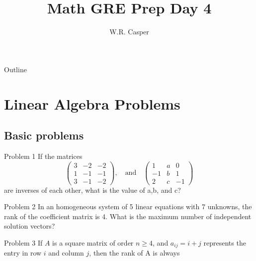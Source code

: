 \documentclass{beamer}
\title{Math GRE Prep Day 4}
\subtitle
{} %
\author[W.R. Casper] %
{W.R. Casper}
\institute[California State University Fullerton] %
{
  Department of Mathematics\\
  California State University Fullerton}
\begin{document}
\begin{frame}
  \titlepage
\end{frame}

\begin{frame}{Outline}
  \tableofcontents
\end{frame}



\section{Linear Algebra Problems}

\subsection{Basic problems}

\begin{frame}{Problem 1}
If the matrices
$$
\left(\begin{array}{ccc}
3 & -2 & -2\\
1 & -1 & -1\\
3 & -1 & -2
\end{array}\right)
,\quad\text{and}\quad
\left(\begin{array}{ccc}
 1 & a & 0\\
-1 & b & 1\\
 2 & c &-1
\end{array}\right)
$$
are inverses of each other, what is the value of a,b, and c?
\end{frame}

\begin{frame}{Problem 2}
In an homogeneous system of 5 linear equations with 7 unknowns, the rank of the coefficient matrix is 4. What is the maximum number of independent solution vectors?
\end{frame}

\begin{frame}{Problem 3}
If $A$ is a square matrix of order $n \geq 4$, and $a_{ij} = i + j$ represents the entry
in row $i$ and column $j$, then the rank of A is always
\end{frame}
\end{document}
